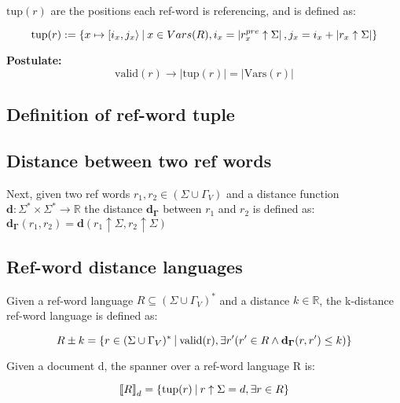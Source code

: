 \documentclass{article}
\newcommand{\abs}[1]{\left|#1\right|}
\newcommand{\set}[1]{\left\{#1\right\}}
\newcommand{\st}{\ \vline \ }
\newcommand{\dbrack}[1]{\left\llbracket#1\right\rrbracket}
\begin{document}
$\mathrm{tup}(r)$ are the positions each ref-word is referencing, and is defined as:

\begin{equation}
    \mathrm{tup}(r) := \set{x \mapsto [i_x, j_x\rangle \st x \in Vars(R), i_x = \abs{r_x^{pre} \uparrow \Sigma}, j_x = i_x + \abs{r_x \uparrow \Sigma}}
\end{equation}

\textbf{Postulate:} 
\begin{equation}
    \mathrm{valid}(r) \rightarrow \abs{\mathrm{tup}(r)} = \abs{\mathrm{Vars}(r)}
\end{equation}
\subsection*{Definition of ref-word tuple}

\subsection*{Distance between two ref words}


Next, given two ref words $r_1, r_2 \in (\Sigma \cup \Gamma_V)$ and
a distance function 
$\mathbf{d} : \Sigma^* \times \Sigma^* \rightarrow \mathbb{R}$
the distance $\mathbf{d_\Gamma}$ between $r_1$ and $r_2$
is defined as: $\mathbf{d_\Gamma}(r_1, r_2) = \mathbf{d}(r_1 \uparrow
\Sigma, r_2 \uparrow \Sigma)$

\subsection*{Ref-word distance languages}

Given a ref-word language $R \subseteq (\Sigma\cup\Gamma_V)^*$ and a distance $k \in \mathbb{R}$, the k-distance ref-word language is defined as:

\begin{equation}
    R \pm k = \set{r \in (\Sigma \cup \Gamma_V)^* \st  \mathrm{valid(r)}, \exists r' (r'\in R \land \mathbf{d_\Gamma}(r, r') \leq k)}
\end{equation}

Given a document d, the spanner over a ref-word language R is:

\begin{equation}
    \dbrack{R}_d = \set{\mathrm{tup}(r) \st r\uparrow \Sigma = d, \exists r \in R}
\end{equation}
\end{document}
